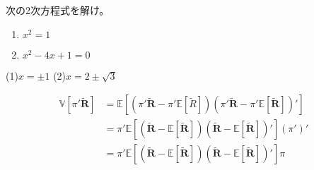 \documentclass{article} %
\begin{document}


  

\noindent{}\par
次の2次方程式を解け。\vspace{-8pt}
\begin{enumerate}[(1)\;]
  \item $x^2=1$
  \item $x^2-4x+1=0$
\end{enumerate}
\noindent{}\par
(1)\quad $x=\pm 1$ \qquad
(2)\quad $x=2 \pm \sqrt{3}$

\begin{align*}
\mathbb{V}[\pi'\bm{\tilde{R}}]&=\mathbb{E}[(\pi'\bm{\tilde{R}}-\pi'\mathbb{E}[\tilde{R}])(\pi'\bm{\tilde{R}}-\pi'\mathbb{E}[\bm{\tilde{R}}])']\\
  
&=\pi'\mathbb{E}[(\bm{\tilde{R}}-\mathbb{E}[\bm{\tilde{R}}])(\bm{\tilde{R}}-\mathbb{E}[\bm{\tilde{R}}])'](\pi')'\\
  
&=\pi'\mathbb{E}[(\bm{\tilde{R}}-\mathbb{E}[\bm{\tilde{R}}])(\bm{\tilde{R}}-\mathbb{E}[\bm{\tilde{R}}])']\pi\\
  
  
  
  
  
\end{align*}
\end{document}

